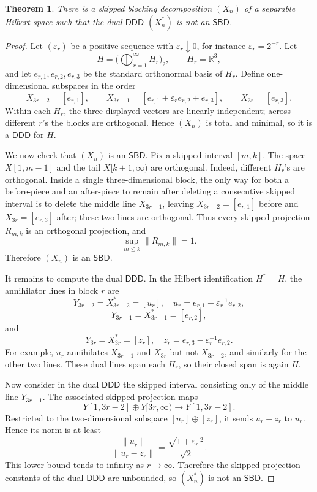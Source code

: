 \documentclass[11pt]{article}
\newtheorem{theorem}{Theorem}
\newcommand{\R}{\mathbb R}
\newcommand{\SBD}{\mathsf{SBD}}
\newcommand{\DDD}{\mathsf{DDD}}
\begin{document}
\begin{theorem}
There is a skipped blocking decomposition \((X_n)\) of a separable Hilbert
space such that the dual \(\DDD\) \((X_n^*)\) is not an \(\SBD\).
\end{theorem}

\begin{proof}
Let \((\varepsilon_r)\) be a positive sequence with
\(\varepsilon_r\downarrow0\), for instance \(\varepsilon_r=2^{-r}\).
Let
\[
H=\biggl(\bigoplus_{r=1}^{\infty} H_r\biggr)_2,
\qquad H_r=\R^3,
\]
and let \(e_{r,1},e_{r,2},e_{r,3}\) be the standard orthonormal basis of
\(H_r\).  Define one-dimensional subspaces in the order
\[
X_{3r-2}=[e_{r,1}],\qquad
X_{3r-1}=[e_{r,1}+\varepsilon_r e_{r,2}+e_{r,3}],\qquad
X_{3r}=[e_{r,3}].
\]
Within each \(H_r\), the three displayed vectors are linearly independent;
across different \(r\)'s the blocks are orthogonal.  Hence \((X_n)\) is total
and minimal, so it is a \(\DDD\) for \(H\).

We now check that \((X_n)\) is an \(\SBD\).  Fix a skipped interval
\([m,k]\).  The space \(X[1,m-1]\) and the tail \(X[k+1,\infty)\) are
orthogonal.  Indeed, different \(H_r\)'s are orthogonal.  Inside a single
three-dimensional block, the only way for both a before-piece and an after-piece
to remain after deleting a consecutive skipped interval is to delete the middle
line \(X_{3r-1}\), leaving \(X_{3r-2}=[e_{r,1}]\) before and
\(X_{3r}=[e_{r,3}]\) after; these two lines are orthogonal.  Thus every skipped
projection \(R_{m,k}\) is an orthogonal projection, and
\[
\sup_{m\le k}\|R_{m,k}\|=1.
\]
Therefore \((X_n)\) is an \(\SBD\).

It remains to compute the dual \(\DDD\).  In the Hilbert identification
\(H^*=H\), the annihilator lines in block \(r\) are
\[
Y_{3r-2}=X_{3r-2}^*=[u_r],
\quad u_r=e_{r,1}-\varepsilon_r^{-1}e_{r,2},
\]
\[
Y_{3r-1}=X_{3r-1}^*=[e_{r,2}],
\]
and
\[
Y_{3r}=X_{3r}^*=[z_r],
\quad z_r=e_{r,3}-\varepsilon_r^{-1}e_{r,2}.
\]
For example, \(u_r\) annihilates \(X_{3r-1}\) and \(X_{3r}\) but not
\(X_{3r-2}\), and similarly for the other two lines.  These dual lines span
each \(H_r\), so their closed span is again \(H\).

Now consider in the dual \(\DDD\) the skipped interval consisting only of the
middle line \(Y_{3r-1}\).  The associated skipped projection maps
\[
Y[1,3r-2]\oplus Y[3r,\infty)\longrightarrow Y[1,3r-2].
\]
Restricted to the two-dimensional subspace \([u_r]\oplus[z_r]\), it sends
\(u_r-z_r\) to \(u_r\).  Hence its norm is at least
\[
\frac{\|u_r\|}{\|u_r-z_r\|}
=
\frac{\sqrt{1+\varepsilon_r^{-2}}}{\sqrt{2}}.
\]
This lower bound tends to infinity as \(r\to\infty\).  Therefore the skipped
projection constants of the dual \(\DDD\) are unbounded, so \((X_n^*)\) is not
an \(\SBD\).
\end{proof}
\end{document}
